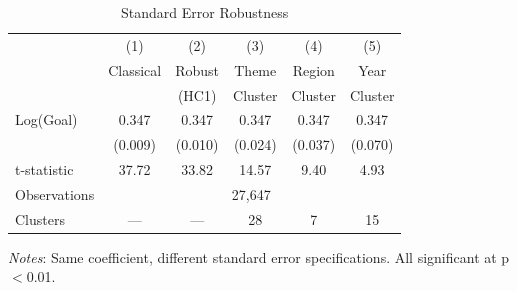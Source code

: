 \begin{table}[htbp]
\centering
\caption{Standard Error Robustness}
\label{tab:se_robust}
\begin{threeparttable}
\begin{tabular}{lccccc}
\toprule
& (1) & (2) & (3) & (4) & (5) \\
& Classical & Robust & Theme & Region & Year \\
& & (HC1) & Cluster & Cluster & Cluster \\
\midrule
Log(Goal) & 0.347 & 0.347 & 0.347 & 0.347 & 0.347 \\
& (0.009) & (0.010) & (0.024) & (0.037) & (0.070) \\
\addlinespace
t-statistic & 37.72 & 33.82 & 14.57 & 9.40 & 4.93 \\
\midrule
Observations & \multicolumn{5}{c}{27,647} \\
Clusters & --- & --- & 28 & 7 & 15 \\
\bottomrule
\end{tabular}
\begin{tablenotes}
\small
\item \textit{Notes}: Same coefficient, different standard error specifications. All significant at p$<$0.01.
\end{tablenotes}
\end{threeparttable}
\end{table}

